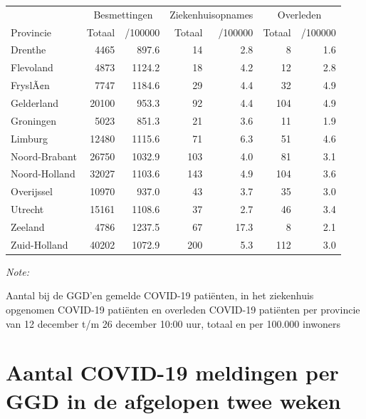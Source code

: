 \documentclass[
  english,
  man,floatsintext]{apa6}
\begin{document}
\begin{table}
\centering
\begin{threeparttable}
\begin{tabular}{lrrrrrr}
\toprule
\multicolumn{1}{c}{ } & \multicolumn{2}{c}{Besmettingen} & \multicolumn{2}{c}{Ziekenhuisopnames} & \multicolumn{2}{c}{Overleden} \\
\cmidrule(l{3pt}r{3pt}){2-3} \cmidrule(l{3pt}r{3pt}){4-5} \cmidrule(l{3pt}r{3pt}){6-7}
Provincie & Totaal & /100000 & Totaal & /100000 & Totaal & /100000\\
\midrule
Drenthe & 4465 & 897.6 & 14 & 2.8 & 8 & 1.6\\
Flevoland & 4873 & 1124.2 & 18 & 4.2 & 12 & 2.8\\
FryslÃ¢n & 7747 & 1184.6 & 29 & 4.4 & 32 & 4.9\\
Gelderland & 20100 & 953.3 & 92 & 4.4 & 104 & 4.9\\
Groningen & 5023 & 851.3 & 21 & 3.6 & 11 & 1.9\\
Limburg & 12480 & 1115.6 & 71 & 6.3 & 51 & 4.6\\
Noord-Brabant & 26750 & 1032.9 & 103 & 4.0 & 81 & 3.1\\
Noord-Holland & 32027 & 1103.6 & 143 & 4.9 & 104 & 3.6\\
Overijssel & 10970 & 937.0 & 43 & 3.7 & 35 & 3.0\\
Utrecht & 15161 & 1108.6 & 37 & 2.7 & 46 & 3.4\\
Zeeland & 4786 & 1237.5 & 67 & 17.3 & 8 & 2.1\\
Zuid-Holland & 40202 & 1072.9 & 200 & 5.3 & 112 & 3.0\\
\bottomrule
\end{tabular}
\begin{tablenotes}
\item \textit{Note: } 
\item Aantal bij de GGD’en gemelde COVID-19 patiënten, in het ziekenhuis opgenomen COVID-19 patiënten en overleden COVID-19 patiënten per provincie van 12 december t/m 26 december 10:00 uur, totaal en per 100.000 inwoners
\end{tablenotes}
\end{threeparttable}
\end{table}

\newpage

\hypertarget{aantal-covid-19-meldingen-per-ggd-in-de-afgelopen-twee-weken}{%
\section{Aantal COVID-19 meldingen per GGD in de afgelopen twee weken}\label{aantal-covid-19-meldingen-per-ggd-in-de-afgelopen-twee-weken}}
\end{document}
